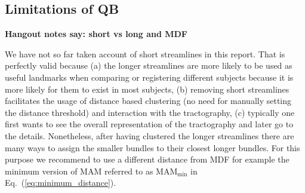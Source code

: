 \documentclass{bioinfo}
\begin{document}


\subsection{Limitations of QB\label{sub:short_tracks}}

\textbf{Hangout notes say: short vs long and MDF}

We have not so far taken account of short streamlines in this
report. That is perfectly valid because (a) the longer streamlines are
more likely to be used as useful landmarks when comparing or registering
different subjects because it is more likely for them to exist in most
subjects, (b) removing short streamlines facilitates the usage of
distance based clustering (no need for manually setting the distance
threshold) and interaction with the tractography, (c) typically one
first wants to see the overall representation of the tractography and
later go to the details. Nonetheless, after having clustered the longer
streamlines there are many ways to assign the smaller bundles to their
closest longer bundles. For this purpose we recommend to use a different
distance from MDF for example the minimum version of MAM referred to as
$\textrm{MAM}_{\textrm{min}}$ in Eq.~(\ref{eq:minimum_distance}).
\end{document}
